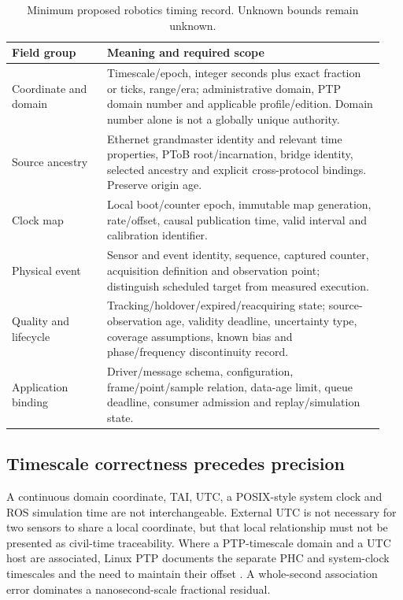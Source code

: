 \documentclass[11pt,letterpaper]{article}
\begin{document}
\begin{table}[htbp]\centering\small
\caption{Minimum proposed robotics timing record. Unknown bounds remain unknown.}\label{tab:contract}
\begin{tabular}{@{}L{0.24\linewidth}L{0.70\linewidth}@{}}\toprule
Field group & Meaning and required scope\\\midrule
Coordinate and domain & Timescale/epoch, integer seconds plus exact fraction or ticks, range/era; administrative domain, PTP domain number and applicable profile/edition. Domain number alone is not a globally unique authority.\\\addlinespace
Source ancestry & Ethernet grandmaster identity and relevant time properties, PToB root/incarnation, bridge identity, selected ancestry and explicit cross-protocol bindings. Preserve origin age.\\\addlinespace
Clock map & Local boot/counter epoch, immutable map generation, rate/offset, causal publication time, valid interval and calibration identifier.\\\addlinespace
Physical event & Sensor and event identity, sequence, captured counter, acquisition definition and observation point; distinguish scheduled target from measured execution.\\\addlinespace
Quality and lifecycle & Tracking/holdover/expired/reacquiring state; source-observation age, validity deadline, uncertainty type, coverage assumptions, known bias and phase/frequency discontinuity record.\\\addlinespace
Application binding & Driver/message schema, configuration, frame/point/sample relation, data-age limit, queue deadline, consumer admission and replay/simulation state.\\\bottomrule
\end{tabular}
\end{table}

\subsection{Timescale correctness precedes precision}
A continuous domain coordinate, TAI, UTC, a POSIX-style system clock and ROS simulation time are not interchangeable. External UTC is not necessary for two sensors to share a local coordinate, but that local relationship must not be presented as civil-time traceability. Where a PTP-timescale domain and a UTC host are associated, Linux PTP documents the separate PHC and system-clock timescales and the need to maintain their offset \cite{phc2sys}. A whole-second association error dominates a nanosecond-scale fractional residual.
\end{document}
